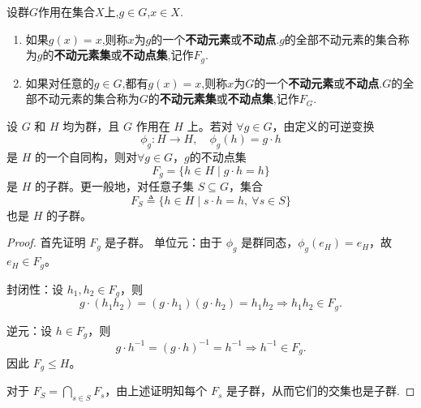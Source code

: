\documentclass[../../main.tex]{subfiles}%
\begin{document}
\begin{definition}
设群$G$作用在集合$X$上,$g\in G$,$x\in X$.
\begin{enumerate}[(1)]
\item 如果$g(x)=x$,则称$x$为$g$的一个\textbf{不动元素}或\textbf{不动点}.$g$的全部不动元素的集合称为$g$的\textbf{不动元素集}或\textbf{不动点集},记作$F_g$.

\item 如果对任意的$g\in G$,都有$g(x)=x$,则称$x$为$G$的一个\textbf{不动元素}或\textbf{不动点}.$G$的全部不动元素的集合称为$G$的\textbf{不动元素集}或\textbf{不动点集},记作$F_G$.
\end{enumerate}
\end{definition}

\begin{proposition}\label{proposition:不动点子群}
设 \(G\) 和 \(H\) 均为群，且 \(G\) 作用在 \(H\) 上。若对 \(\forall g\in G\)，由定义的可逆变换
\[
\phi_g : H \to H,\quad \phi_g(h)=g\cdot h
\]
是 \(H\) 的一个自同构，则对\(\forall g\in G\)，$g$的不动点集
\[
F_g = \{ h\in H \mid g\cdot h = h \}
\]
是 \(H\) 的子群。更一般地，对任意子集 \(S\subseteq G\)，集合
\[
F_S \triangleq  \{ h\in H \mid s\cdot h = h,\ \forall s\in S \}
\]
也是 \(H\) 的子群。
\end{proposition}
\begin{proof}
首先证明 \(F_g\) 是子群。
单位元：由于 \(\phi_g\) 是群同态，\(\phi_g(e_H)=e_H\)，故 \(e_H\in F_g\)。

封闭性：设 \(h_1,h_2\in F_g\)，则
\[
g\cdot(h_1h_2) = (g\cdot h_1)(g\cdot h_2) = h_1 h_2\Longrightarrow h_1h_2\in F_g.
\]

逆元：设 \(h\in F_g\)，则
\[
g\cdot h^{-1} = (g\cdot h)^{-1} = h^{-1}\Longrightarrow h^{-1}\in F_g.
\]
因此 \(F_g\leqslant H\)。

对于 \(F_S = \bigcap_{s\in S} F_s\)，由上述证明知每个 \(F_s\) 是子群，从而它们的交集也是子群.
\end{proof}
\end{document}
